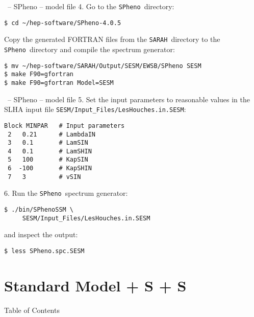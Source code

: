 \documentclass[11pt]{beamer}
\newcommand{\SARAH}{\texttt{SARAH}}
\newcommand{\SPheno}{\texttt{SPheno}}
\begin{document}

\begin{frame}[fragile]{\insertsection\ -- SPheno -- model file}
  4. Go to the \SPheno\ directory:
  \begin{lstlisting}
$ cd ~/hep-software/SPheno-4.0.5\end{lstlisting}%
  Copy the generated FORTRAN files from the \SARAH\ directory to the
  \SPheno\ directory and compile the spectrum generator:
  \begin{lstlisting}
$ mv ~/hep-software/SARAH/Output/SESM/EWSB/SPheno SESM
$ make F90=gfortran
$ make F90=gfortran Model=SESM\end{lstlisting}%
\end{frame}


\begin{frame}[fragile]{\insertsection\ -- SPheno -- model file}
  5. Set the input parameters to reasonable values in the SLHA input
  file \texttt{SESM/Input\_Files/LesHouches.in.SESM}:
  \begin{lstlisting}
Block MINPAR   # Input parameters 
 2   0.21      # LambdaIN
 3   0.1       # LamSIN
 4   0.1       # LamSHIN
 5   100       # KapSIN
 6  -100       # KapSHIN
 7   3         # vSIN\end{lstlisting}%
  6. Run the \SPheno\ spectrum generator:
  \begin{lstlisting}
$ ./bin/SPhenoSSM \
     SESM/Input_Files/LesHouches.in.SESM\end{lstlisting}%
  and inspect the output:
  \begin{lstlisting}
$ less SPheno.spc.SESM\end{lstlisting}%
\end{frame}


\section{Standard Model + S + S}


\begin{frame}{Table of Contents}
  \tableofcontents[currentsection]
\end{frame}

\end{document}
